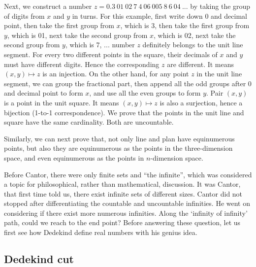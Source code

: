 \documentclass{article}
\begin{document}
Next, we construct a number $z = 0.3\ 01\ 02\ 7\ 4\ 06\ 005\ 8\ 6\ 04\ ...$ by taking the group of digits from $x$ and $y$ in turns. For this example, first write down 0 and decimal point, then take the first group from $x$, which is 3, then take the first group from $y$, which is 01, next take the second group from $x$, which is 02, next take the second group from $y$, which is 7, ... number $z$ definitely belongs to the unit line segment. For every two different points in the square, their decimals of $x$ and $y$ must have different digits. Hence the corresponding $z$ are different. It means $(x, y) \mapsto z$ is an injection. On the other hand, for any point $z$ in the unit line segment, we can group the fractional part, then append all the odd groups after 0 and decimal point to form $x$, and use all the even groups to form $y$. Pair $(x, y)$ is a point in the unit square. It means $(x, y) \mapsto z$ is also a surjection, hence a bijection (1-to-1 correspondence). We prove that the points in the unit line and square have the same cardinality. Both are uncountable.

Similarly, we can next prove that, not only line and plan have equinumerous points, but also they are equinumerous as the points in the three-dimension space, and even equinumerous as the points in $n$-dimension space.

Before Cantor, there were only finite sets and ``the infinite'', which was considered a topic for philosophical, rather than mathematical, discussion. It was Cantor, that first time told us, there exist infinite sets of different sizes. Cantor did not stopped after differentiating the countable and uncountable infinities. He went on considering if there exist more numerous infinities. Along the `infinity of infinity' path, could we reach to the end point? Before answering these question, let us first see how Dedekind define real numbers with his genius idea.

\begin{Exercise}
\end{Exercise}

\subsection{Dedekind cut}
\end{document}
